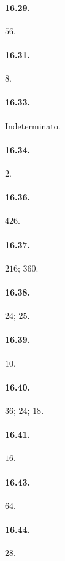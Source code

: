 \begin{multicols}{2}
\paragraph{16.29.}
$56$.

\paragraph{16.31.}
$8$.

\paragraph{16.33.}
Indeterminato.

\paragraph{16.34.}
$2$.

\paragraph{16.36.}
$426$.

\paragraph{16.37.}
$216$; $360$.

\paragraph{16.38.}
$24$; $25$.

\paragraph{16.39.}
$10$.

\paragraph{16.40.}
$36$; $24$; $18$.

\paragraph{16.41.}
$16$.

\paragraph{16.43.}
$64$.

\paragraph{16.44.}
$28$.


\end{multicols}
